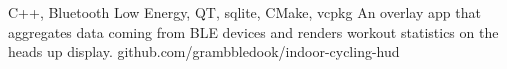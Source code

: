 \documentclass[a4paper,10pt]{article}
\begin{document}
    {C++, Bluetooth Low Energy, QT, sqlite, CMake, vcpkg}
    {An overlay app that aggregates data coming from BLE devices and renders workout statistics on the heads up display.}
    {github.com/grambbledook/indoor-cycling-hud}
%
%
\end{document}
